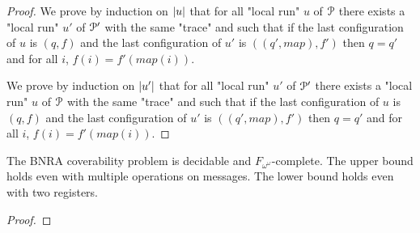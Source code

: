 \begin{proof}
	
	We prove by induction on $|u|$ that for all "local run" $u$ of $\mathcal{P}$ there exists a "local run" $u'$ of $\mathcal{P}'$ with the same "trace" and such that if the last configuration of $u$ is $(q,f)$ and the last configuration of $u'$ is $((q',map), f')$ then $q=q'$ and for all $i$, $f(i) = f'(map(i))$.  
	
	
	We prove by induction on $|u'|$ that for all "local run" $u'$ of $\mathcal{P}'$ there exists a "local run" $u$ of $\mathcal{P}$ with the same "trace" and such that if the last configuration of $u$ is $(q,f)$ and the last configuration of $u'$ is $((q',map), f')$ then $q=q'$ and for all $i$, $f(i) = f'(map(i))$.
	
\end{proof}

\begin{theorem}
	The BNRA coverability problem is decidable and $F_{\omega^\omega}$-complete.
	The upper bound holds even with multiple operations on messages.
	The lower bound holds even with two registers.
\end{theorem}

\begin{proof}
\end{proof}
